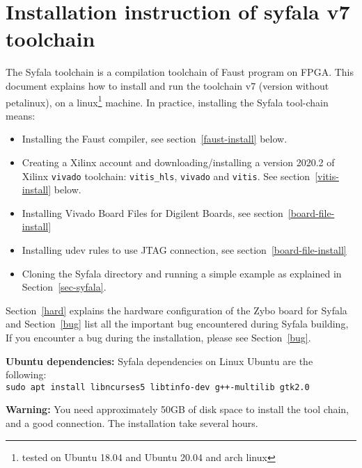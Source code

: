 \section{Installation instruction of  syfala v7 toolchain}
\label{annex}
\label{install}
The Syfala toolchain is a compilation toolchain of Faust program on FPGA. This document explains how to install and run the toolchain v7  (version without petalinux), on a linux\footnote{tested on Ubuntu 18.04 and Ubuntu 20.04 and arch linux} machine. In practice, installing the Syfala tool-chain  means:
\begin{itemize}
\item Installing the Faust compiler, see section~\ref{faust-install} below.
\item Creating a Xilinx account and downloading/installing a  version 2020.2 of Xilinx {\tt vivado} toolchain: {\tt vitis\_hls}, {\tt vivado} and {\tt vitis}. See section~\ref{vitis-install} below.
\item Installing Vivado Board Files for Digilent Boards, see section~\ref{board-file-install}
\item Installing udev rules to use JTAG connection, see section~\ref{board-file-install}  
\item Cloning the Syfala directory and running a simple example as explained in Section~\ref{sec-syfala}.
\end{itemize}
Section~\ref{hard} explains the hardware configuration of the Zybo board for Syfala and Section~\ref{bug} list all the important bug encountered during Syfala building, If you encounter a bug during the installation, please see Section~\ref{bug}.


{\bf Ubuntu dependencies:} Syfala dependencies on Linux Ubuntu are the following:\\
\texttt{sudo apt install libncurses5 libtinfo-dev g++-multilib gtk2.0}

{\bf Warning:} You need approximately 50GB of disk space to install the tool chain, and a good connection. The installation take several hours.
           

